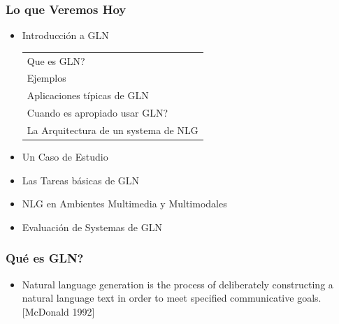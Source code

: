 \documentclass[compress,color=usenames]{beamer}
\begin{document}
\begin{frame}
\frametitle{Lo que Veremos Hoy}

\begin{itemize}
\item  Introducci\'on a GLN 
\begin{tabular}{|l}
 {\small Que es GLN?}\\
 {\small Ejemplos}\\
 {\small Aplicaciones t\'ipicas de GLN}\\
 {\small Cuando es apropiado usar GLN?}\\
 {\small La Arquitectura de un systema de NLG}
\end{tabular}

\item  Un Caso de Estudio
\item  Las Tareas b\'asicas de GLN
\item  NLG en Ambientes Multimedia y Multimodales
\item Evaluaci\'on de Systemas de GLN
\end{itemize}
\end{frame}

\begin{frame}
\frametitle{Qu\'e es GLN?}

\begin{itemize}
\item { {Natural language generation is the process of deliberately constructing a natural language text in order to meet specified communicative goals.}}\\

\hfill [McDonald 1992]
\end{itemize}


\end{frame}
\end{document}
